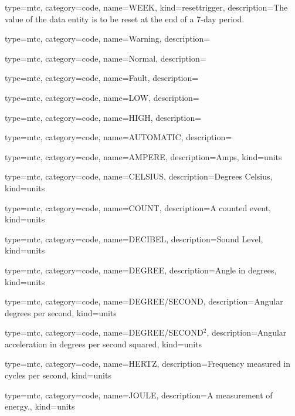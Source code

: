 {
  type=mtc,
  category=code,
  name={WEEK},
  kind={resettrigger},
  description={The value of the \gls{data entity} is to be reset at the end of a 7-day period.}
}


{
  type=mtc,
  category=code,
  name={Warning},
  description={}
}


{
  type=mtc,
  category=code,
  name={Normal},
  description={}
}


{
  type=mtc,
  category=code,
  name={Fault},
  description={}
}


{
  type=mtc,
  category=code,
  name={LOW},
  description={}
}


{
  type=mtc,
  category=code,
  name={HIGH},
  description={}
}


{
  type=mtc,
  category=code,
  name={AUTOMATIC},
  description={}
}


{
  type=mtc,
  category=code,
  name={AMPERE},
  description={Amps},
  kind={units}
}


{
  type=mtc,
  category=code,
  name={CELSIUS},
  description={Degrees Celsius},
  kind={units}
}


{
  type=mtc,
  category=code,
  name={COUNT},
  description={A counted event},
  kind={units}
}


{
  type=mtc,
  category=code,
  name={DECIBEL},
  description={Sound Level},
  kind={units}
}


{
  type=mtc,
  category=code,
  name={DEGREE},
  description={Angle in degrees},
  kind={units}
}


{
  type=mtc,
  category=code,
  name={DEGREE/SECOND},
  description={Angular degrees per second},
  kind={units}
}


{
  type=mtc,
  category=code,
  name={DEGREE/SECOND$^2$},
  description={Angular acceleration in degrees per second squared},
  kind={units}
}


{
  type=mtc,
  category=code,
  name={HERTZ},
  description={Frequency measured in cycles per second},
  kind={units}
}


{
  type=mtc,
  category=code,
  name={JOULE},
  description={A measurement of energy.},
  kind={units}
}


